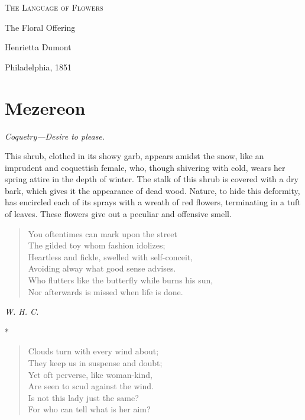 \documentclass[11pt,twoside]{article}
\newcommand\flower[2]{\section*{#1}\addcontentsline{toc}{section}{#1}%
  \noindent\textit{#2.}\par\medskip}
\newcommand\stars{\begin{center}*\quad*\quad*\end{center}}
\newcommand\by[1]{\par\hfill\textit{#1}\par}
\begin{document}
\thispagestyle{empty}
\begin{floratitle}
\centering
{\Huge\scshape The Language of Flowers\par}
\vspace{1.2em}
{\large The Floral Offering\par}
\end{floratitle}
\vspace{5cm}
\begin{center}
{\large Henrietta Dumont\par}
\vspace{1em}
Philadelphia, 1851
\end{center}
\clearpage
\restoregeometry

\flower{Mezereon}{Coquetry---Desire to please}

This shrub, clothed in its showy garb, appears amidst the snow, like an imprudent and coquettish female, who, though shivering with cold, wears her spring attire in the depth of winter. The stalk of this shrub is covered with a dry bark, which gives it the appearance of dead wood. Nature, to hide this deformity, has encircled each of its sprays with a wreath of red flowers, terminating in a tuft of leaves. These flowers give out a peculiar and offensive smell.

\begin{verse}
\quad You oftentimes can mark upon the street\\
\quad The gilded toy whom fashion idolizes;\\
\quad Heartless and fickle, swelled with self-conceit,\\
\quad Avoiding alway what good sense advises.\\
Who flutters like the butterfly while burns his sun,\\
Nor afterwards is missed when life is done.
\end{verse}

\by{W. H. C.}

\stars

\begin{verse}
Clouds turn with every wind about;\\
They keep us in suspense and doubt;\\
Yet oft perverse, like woman-kind,\\
Are seen to scud against the wind.\\
Is not this lady just the same?\\
For who can tell what is her aim?
\end{verse}
\end{document}
